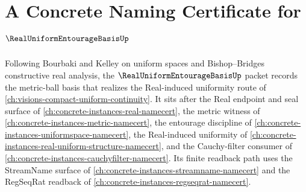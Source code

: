 \chapter{A Concrete Naming Certificate for $\RealUniformEntourageBasisUp$}
\label{ch:concrete-instances-real-uniform-entourage-basis-namecert}

Following Bourbaki and Kelley on uniform spaces and Bishop--Bridges constructive real analysis, the $\RealUniformEntourageBasisUp$ packet records the metric-ball basis that realizes the Real-induced uniformity route of \autoref{ch:visions-compact-uniform-continuity}. It sits after the Real endpoint and seal surface of \autoref{ch:concrete-instances-real-namecert}, the metric witness of \autoref{ch:concrete-instances-metric-namecert}, the entourage discipline of \autoref{ch:concrete-instances-uniformspace-namecert}, the Real-induced uniformity of \autoref{ch:concrete-instances-real-uniform-structure-namecert}, and the Cauchy-filter consumer of \autoref{ch:concrete-instances-cauchyfilter-namecert}. Its finite readback path uses the StreamName surface of \autoref{ch:concrete-instances-streamname-namecert} and the RegSeqRat readback of \autoref{ch:concrete-instances-regseqrat-namecert}.


